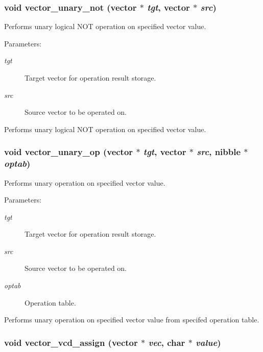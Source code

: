 \subsubsection{\setlength{\rightskip}{0pt plus 5cm}void vector\_\-unary\_\-not ({\bf vector} $\ast$ {\em tgt}, {\bf vector} $\ast$ {\em src})}\label{vector_8h_a31}


Performs unary logical NOT operation on specified vector value.

\begin{Desc}
\item[Parameters: ]\par
\begin{description}
\item[{\em 
tgt}]Target vector for operation result storage. \item[{\em 
src}]Source vector to be operated on.\end{description}
\end{Desc}
Performs unary logical NOT operation on specified vector value. 
\subsubsection{\setlength{\rightskip}{0pt plus 5cm}void vector\_\-unary\_\-op ({\bf vector} $\ast$ {\em tgt}, {\bf vector} $\ast$ {\em src}, {\bf nibble} $\ast$ {\em optab})}\label{vector_8h_a30}


Performs unary operation on specified vector value.

\begin{Desc}
\item[Parameters: ]\par
\begin{description}
\item[{\em 
tgt}]Target vector for operation result storage. \item[{\em 
src}]Source vector to be operated on. \item[{\em 
optab}]Operation table.\end{description}
\end{Desc}
Performs unary operation on specified vector value from specifed operation table. 
\subsubsection{\setlength{\rightskip}{0pt plus 5cm}void vector\_\-vcd\_\-assign ({\bf vector} $\ast$ {\em vec}, char $\ast$ {\em value})}\label{vector_8h_a19}


